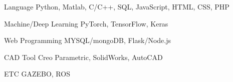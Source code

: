 


\begin{cvskills}


\cvskill
{Language} %
{Python, Matlab, C/C++, SQL, JavaScript, HTML, CSS, PHP} %


\cvskill
{Machine/Deep Learning} %
{PyTorch, TensorFlow,  Keras} %


\cvskill
{Web Programming} %
{MYSQL/mongoDB,  Flask/Node.js} %

\cvskill
{CAD Tool} %
{Creo Parametric, SolidWorks, AutoCAD} %

\cvskill
{ETC}
{GAZEBO, ROS}



\end{cvskills}
